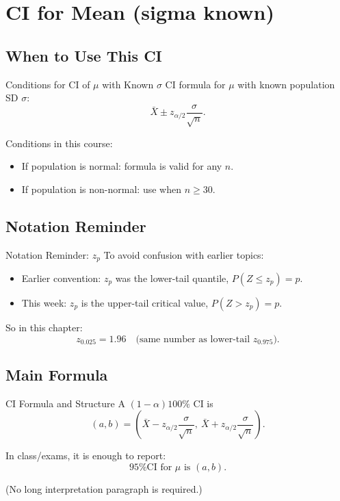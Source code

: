 \documentclass[aspectratio=169]{beamer}
\begin{document}
\section{CI for Mean (sigma known)}

\subsection{When to Use This CI}
\begin{frame}{Conditions for CI of \(\mu\) with Known \(\sigma\)}
  CI formula for \(\mu\) with known population SD \(\sigma\):
  \[
    \bar X \pm z_{\alpha/2}\frac{\sigma}{\sqrt{n}}.
  \]

  \vspace{2mm}
  Conditions in this course:
  \begin{itemize}
    \item If population is normal: formula is valid for any \(n\).
    \item If population is non-normal: use when \(n\ge 30\).
  \end{itemize}
\end{frame}

\subsection{Notation Reminder}
\begin{frame}{Notation Reminder: \(z_p\)}
  To avoid confusion with earlier topics:
  \begin{itemize}
    \item Earlier convention: \(z_p\) was the lower-tail quantile, \(P(Z\le z_p)=p\).
    \item This week: \(z_p\) is the upper-tail critical value, \(P(Z>z_p)=p\).
  \end{itemize}

  \vspace{1mm}
  So in this chapter:
  \[
    z_{0.025}=1.96
    \quad\text{(same number as lower-tail }z_{0.975}\text{).}
  \]
\end{frame}

\subsection{Main Formula}
\begin{frame}{CI Formula and Structure}
  A \((1-\alpha)100\%\) CI is
  \[
    (a,b)=\left(\bar X-z_{\alpha/2}\frac{\sigma}{\sqrt{n}},\ \bar X+z_{\alpha/2}\frac{\sigma}{\sqrt{n}}\right).
  \]

  \vspace{2mm}
  In class/exams, it is enough to report:
  \[
    \text{95\% CI for }\mu\text{ is }(a,b).
  \]

  \vspace{1mm}
  (No long interpretation paragraph is required.)
\end{frame}
\end{document}
